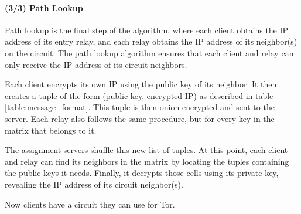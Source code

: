 \paragraph{(3/3) Path Lookup}
Path lookup is the final step of the algorithm, where each client obtains the
IP address of its entry relay, and each relay obtains the IP address of its
neighbor(s) on the circuit. The path lookup algorithm ensures that each client
and relay can only receive the IP address of its circuit neighbors.

Each client encrypts its own IP using the public key of its neighbor. It then
creates a tuple of the form (public key, encrypted IP) as described in table
\ref{table:message_format}. This tuple is then onion-encrypted and sent to the
server.  Each relay also follows the same procedure, but for every key in the
matrix that belongs to it.

The assignment servers shuffle this new list of tuples. At this point, each
client and relay can find its neighbors in the matrix by locating the tuples
containing the public keys it needs. Finally, it decrypts those cells using
its private key, revealing the IP address of its circuit neighbor(s).

Now clients have a circuit they can use for Tor.

